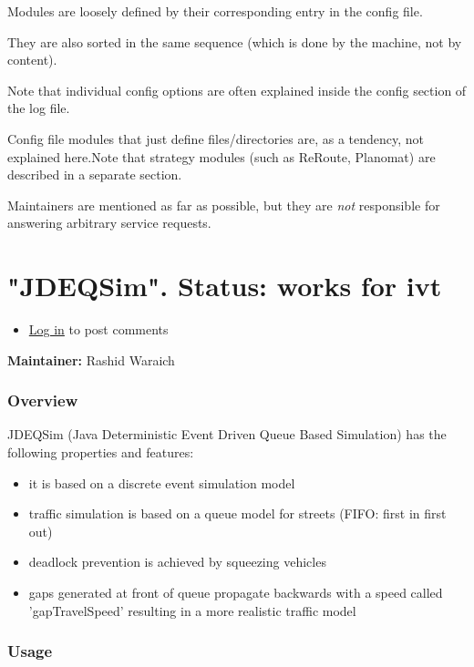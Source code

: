 \documentclass[a4paper,11pt]{report}
\begin{document}
Modules are loosely defined by their corresponding entry in the config file.

They are also sorted in the same sequence (which is done by the machine, not by content).

Note that individual config options are often explained inside the config section of the log file.

Config file modules that just define files/directories are, as a tendency, not explained here.Note that strategy modules (such as ReRoute, Planomat) are described in a separate section.

Maintainers are mentioned as far as possible, but they are \emph{not} responsible for answering arbitrary service requests.

\vfill\eject
\section{"JDEQSim".  Status: works for ivt}
\begin{itemize}
	\item \href{http://www.matsim.org/user/login?destination=comment/reply/249%23comment-form}{Log in} to post comments
\end{itemize}

\textbf{Maintainer:} Rashid Waraich

\subsubsection{Overview}

JDEQSim (Java Deterministic Event Driven Queue Based Simulation) has the following properties and features:
\begin{itemize}
	\item it is based on a discrete event simulation model
	\item traffic simulation is based on a queue model for streets (FIFO: first in first out)
	\item deadlock prevention is achieved by squeezing vehicles
	\item gaps  generated at front of queue propagate backwards with a speed called  'gapTravelSpeed' resulting in a more realistic traffic model
\end{itemize}

\subsubsection{Usage}
\end{document}

